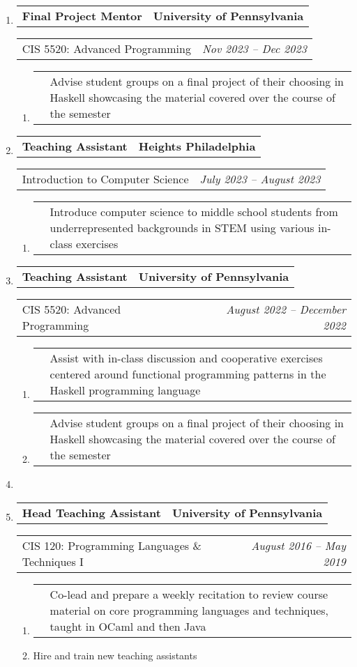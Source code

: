 \documentclass[letterpaper]{article}
\makeatletter
\newcommand*{\tabulardef}[3]{\begin{tabular}[t]{@{}lp{\dimexpr\linewidth-#1}@{}}
    #2&#3
\end{tabular}}
\newcommand{\headerrow}[2]
{\begin{tabular*}{\linewidth}{l@{\extracolsep{\fill}}r}
	#1 &
	#2 \\
\end{tabular*}}
\makeatother
\begin{document}
\begin{enumerate}[label=]
	\parskip=-0.25em

    \item
        \headerrow
            {\textbf{Final Project Mentor}}
            {\textbf{University of Pennsylvania}}
        \headerrow
            {CIS 5520: Advanced Programming}
            {\emph{Nov 2023 -- Dec 2023}}
        \begin{enumerate}[label= *]
            \parskip=-0.1em
        \item\tabulardef{5cm}{}{Advise student groups on a final project of their choosing in Haskell showcasing the material covered over the course of the semester}
        \end{enumerate}

    \item
		\headerrow
			{\textbf{Teaching Assistant}}
			{\textbf{Heights Philadelphia}}
	\headerrow
		{Introduction to Computer Science}
		{\emph{July 2023 -- August 2023}}
	\begin{enumerate}[label= *]
		\parskip=-0.1em
    \item\tabulardef{5cm}{}{Introduce computer science to middle school students from underrepresented backgrounds in STEM using various in-class exercises}
	\end{enumerate}

    \newpage

	\item
		\headerrow
			{\textbf{Teaching Assistant}}
			{\textbf{University of Pennsylvania}}
	\headerrow
		{CIS 5520: Advanced Programming}
		{\emph{August 2022 -- December 2022}}
	\begin{enumerate}[label= *]
		\parskip=-0.1em
        \item\tabulardef{5cm}{}{Assist with in-class discussion and cooperative exercises centered around functional programming patterns in the Haskell programming language}        
        \item\tabulardef{5cm}{}{Advise student groups on a final project of their choosing in Haskell showcasing the material covered over the course of the semester}
	\end{enumerate}

     \item

	\item
		\headerrow
			{\textbf{Head Teaching Assistant}}
			{\textbf{University of Pennsylvania}}
	\headerrow
		{CIS 120: Programming Languages \& Techniques I}
		{\emph{August 2016 -- May 2019}}
	\begin{enumerate}[label= *]
		\parskip=-0.1em
        \item\tabulardef{5cm}{}{Co-lead and prepare a weekly recitation to review course material on core programming languages and techniques, taught in OCaml and then Java}
		\item Hire and train new teaching assistants
	\end{enumerate}
\end{enumerate}
\end{document}
